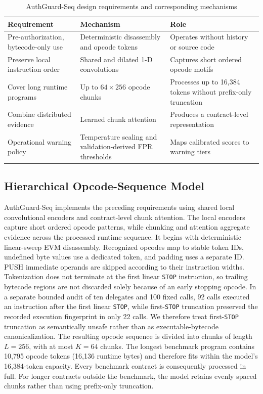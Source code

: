 \documentclass[conference]{IEEEtran}
\newcommand{\code}[1]{\texttt{#1}}
\begin{document}
\begin{table}[t]
\centering
\caption{AuthGuard-Seq design requirements and corresponding mechanisms}
\label{tab:design-map}
\scriptsize
\begin{tabularx}{\columnwidth}{@{}X X X@{}}
\toprule
Requirement & Mechanism & Role \\
\midrule
Pre-authorization, bytecode-only use & Deterministic disassembly and opcode tokens & Operates without history or source code \\
Preserve local instruction order & Shared and dilated 1-D convolutions & Captures short ordered opcode motifs \\
Cover long runtime programs & Up to $64\times256$ opcode chunks & Processes up to 16,384 tokens without prefix-only truncation \\
Combine distributed evidence & Learned chunk attention & Produces a contract-level representation \\
Operational warning policy & Temperature scaling and validation-derived FPR thresholds & Maps calibrated scores to warning tiers \\
\bottomrule
\end{tabularx}
\end{table}



\subsection{Hierarchical Opcode-Sequence Model}

AuthGuard-Seq implements the preceding requirements using shared local convolutional encoders and contract-level chunk attention. The local encoders capture short ordered opcode patterns, while chunking and attention aggregate evidence across the processed runtime sequence. It begins with deterministic linear-sweep EVM disassembly. Recognized opcodes map to stable token IDs, undefined byte values use a dedicated token, and padding uses a separate ID. PUSH immediate operands are skipped according to their instruction widths. Tokenization does not terminate at the first linear \code{STOP} instruction, so trailing bytecode regions are not discarded solely because of an early stopping opcode. In a separate bounded audit of ten delegates and 100 fixed calls, 92 calls executed an instruction after the first linear \code{STOP}, while first-\code{STOP} truncation preserved the recorded execution fingerprint in only 22 calls. We therefore treat first-\code{STOP} truncation as semantically unsafe rather than as executable-bytecode canonicalization. The resulting opcode sequence is divided into chunks of length $L=256$, with at most $K=64$ chunks. The longest benchmark program contains 10,795 opcode tokens (16,136 runtime bytes) and therefore fits within the model's 16,384-token capacity. Every benchmark contract is consequently processed in full. For longer contracts outside the benchmark, the model retains evenly spaced chunks rather than using prefix-only truncation.
\end{document}
